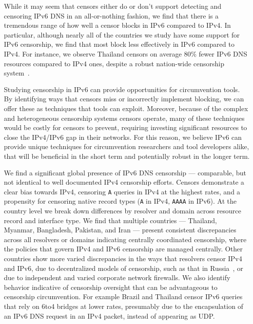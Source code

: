 %

While it may seem that censors either do or don't support detecting and
censoring IPv6 DNS in an all-or-nothing fashion, we find that there is a
tremendous range of how well a censor blocks in IPv6 compared to IPv4.
%
In particular, although nearly all of the countries we study have some support
for IPv6 censorship, we find that most block less effectively in IPv6 compared
to IPv4. For instance, we observe Thailand censors on average 80\% fewer IPv6
DNS resources compared to IPv4 ones, despite a robust nation-wide censorship
system~\cite{gebhart2017internet}.

Studying censorship in IPv6 can provide opportunities for circumvention tools.
By identifying ways that censors miss or incorrectly implement blocking, we can
offer these as techniques that tools can exploit. Moreover, because of the
complex and heterogeneous censorship systems censors operate, many of these
techniques would be costly for censors to prevent, requiring investing
significant resources to close the IPv4/IPv6 gap in their networks. For this
reason, we believe IPv6 can provide unique techniques for circumvention
researchers and tool developers alike, that will be beneficial in the short term
and potentially robust in the longer term.

\medskip
We find a significant global presence of IPv6 DNS censorship --- comparable, but
not identical to well documented IPv4 censorship efforts. Censors demonstrate a
clear bias towards IPv4, censoring \texttt{A} queries in IPv4 at the highest
rates, and a propensity for censoring native record types (\texttt{A} in IPv4,
\texttt{AAAA} in IPv6). At the country level we break down differences by
resolver and domain across resource record and interface type. We find that
multiple countries --- Thailand, Myanmar, Bangladesh, Pakistan, and Iran ---
present consistent discrepancies across all resolvers or domains indicating
centrally coordinated censorship, where the policies that govern IPv4 and IPv6
censorship are managed centrally. Other countries show more varied discrepancies
in the ways that resolvers censor IPv4 and IPv6, due to decentralized models of
censorship, such as that in Russia~\cite{ramesh2020decentralized}, or due to
independent and varied corporate network firewalls.
%
We also identify behavior indicative of censorship oversight that can be
advantageous to censorship circumvention. For example Brazil and Thailand censor
IPv6 queries that rely on 6to4 bridges at lower rates, presumably due to the
encapsulation of an IPv6 DNS request in an IPv4 packet, instead of appearing as
UDP.

